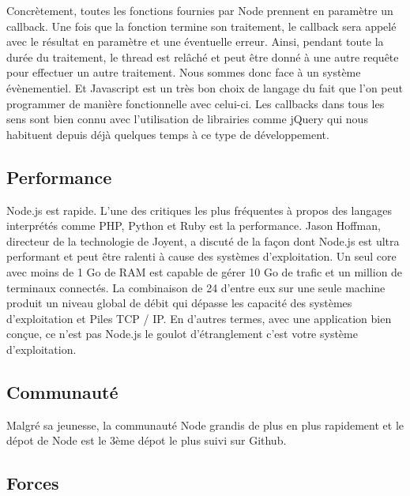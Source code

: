 Concrètement, toutes les fonctions fournies par Node prennent en paramètre un callback. Une fois que la fonction termine son traitement, le callback sera appelé avec le résultat en paramètre et une éventuelle erreur. Ainsi, pendant toute la durée du traitement, le thread est relâché et peut être donné à une autre requête pour effectuer un autre traitement. Nous sommes donc face à un système évènementiel. Et Javascript est un très bon choix de langage du fait que l'on peut programmer de manière fonctionnelle avec celui-ci. Les callbacks dans tous les sens sont bien connu avec l’utilisation de librairies comme jQuery qui nous habituent depuis déjà quelques temps à ce type de développement.

\subsection{Performance}

Node.js est rapide. L'une des critiques les plus fréquentes à propos des langages interprétés comme PHP, Python et Ruby est la performance. Jason Hoffman, directeur de la technologie de Joyent, a discuté de la façon dont Node.js est ultra performant et peut être ralenti à cause des systèmes d'exploitation. Un seul core avec moins de 1 Go de RAM est capable de gérer 10 Go de trafic et un million de terminaux connectés. La combinaison de 24 d'entre eux sur une seule machine produit un niveau global de débit qui dépasse les capacité des systèmes d'exploitation et Piles TCP / IP. En d'autres termes, avec une application bien conçue, ce n'est pas Node.js le goulot d'étranglement c'est votre système d'exploitation.

\subsection{Communauté}

Malgré sa jeunesse, la communauté Node grandis de plus en plus rapidement et le dépot de Node est le 3ème dépot le plus suivi sur Github.

\subsection{Forces}

